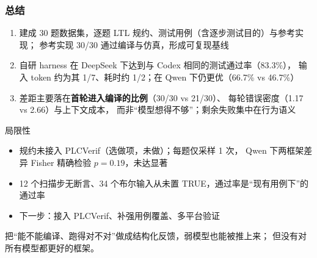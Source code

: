 \documentclass[10pt,aspectratio=169]{beamer}
\begin{document}
\begin{frame}
  \frametitle{总结}

  \begin{enumerate}
    \item 建成 30 题数据集，逐题 LTL 规约、测试用例（含逐步测试目的）与参考实现；
          参考实现 30/30 通过编译与仿真，形成可复现基线
    \item 自研 harness 在 DeepSeek 下达到与 Codex 相同的测试通过率（83.3\%），
          输入 token 约为其 1/7、耗时约 1/2；在 Qwen 下仍更优（66.7\% vs 46.7\%）
    \item 差距主要落在\textbf{首轮进入编译的比例}（30/30 vs 21/30）、
          每轮错误密度（1.17 vs 2.66）与上下文成本，
          而非“模型想得不够”；剩余失败集中在行为语义
  \end{enumerate}

  \vspace{1mm}
  \begin{block}{局限性}
    \begin{itemize}
      \item 规约未接入 PLCVerif（选做项，未做）；每题仅采样 1 次，
            Qwen 下两框架差异 Fisher 精确检验 $p=0.19$，未达显著
      \item 12 个扫描步无断言、34 个布尔输入从未置 TRUE，通过率是“现有用例下”的通过率
      \item 下一步：接入 PLCVerif、补强用例覆盖、多平台验证
    \end{itemize}
  \end{block}

  \vspace{0.3em}
  \begin{center}\small
    把“能不能编译、跑得对不对”做成结构化反馈，弱模型也能被推上来；
    但没有对所有模型都更好的框架。
  \end{center}
\end{frame}
\end{document}
